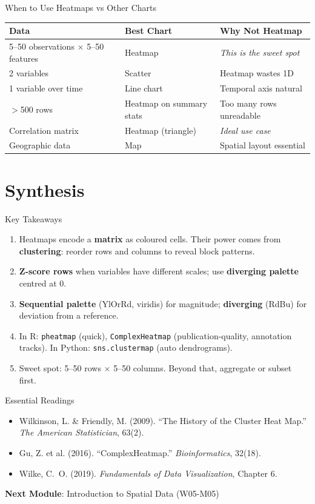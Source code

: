 \documentclass[10pt]{beamer}
\begin{document}
\begin{frame}{When to Use Heatmaps vs Other Charts}
  \centering
  \begin{tabular}{lll}
    \toprule
    \textbf{Data} & \textbf{Best Chart} & \textbf{Why Not Heatmap} \\
    \midrule
    5--50 observations $\times$ 5--50 features & Heatmap & \emph{This is the sweet spot} \\
    2 variables & Scatter & Heatmap wastes 1D \\
    1 variable over time & Line chart & Temporal axis natural \\
    $>$500 rows & Heatmap on summary stats & Too many rows unreadable \\
    Correlation matrix & Heatmap (triangle) & \emph{Ideal use case} \\
    Geographic data & Map & Spatial layout essential \\
    \bottomrule
  \end{tabular}
\end{frame}

\section{Synthesis}

\begin{frame}{Key Takeaways}
  \begin{enumerate}
    \item Heatmaps encode a \textbf{matrix} as coloured cells.
          Their power comes from \textbf{clustering}: reorder rows
          and columns to reveal block patterns.
    \item \textbf{Z-score rows} when variables have different scales;
          use \textbf{diverging palette} centred at 0.
    \item \textbf{Sequential palette} (YlOrRd, viridis) for magnitude;
          \textbf{diverging} (RdBu) for deviation from a reference.
    \item In R: \texttt{pheatmap} (quick), \texttt{ComplexHeatmap}
          (publication-quality, annotation tracks).
          In Python: \texttt{sns.clustermap} (auto dendrograms).
    \item Sweet spot: 5--50 rows $\times$ 5--50 columns. Beyond that,
          aggregate or subset first.
  \end{enumerate}
\end{frame}

\begin{frame}{Essential Readings}
  \begin{itemize}
    \item Wilkinson, L. \& Friendly, M. (2009). ``The History of the
          Cluster Heat Map.'' \emph{The American Statistician}, 63(2).
    \item Gu, Z. et al. (2016). ``ComplexHeatmap.''
          \emph{Bioinformatics}, 32(18).
    \item Wilke, C.~O. (2019). \emph{Fundamentals of Data Visualization},
          Chapter 6.
  \end{itemize}
  \vspace{6pt}
  \textbf{Next Module}: Introduction to Spatial Data (W05-M05)
\end{frame}
\end{document}
